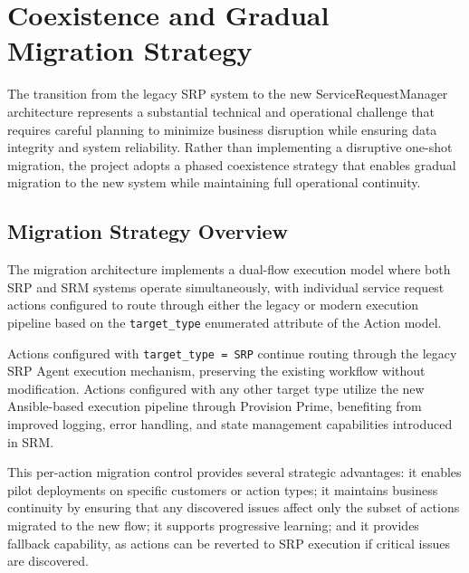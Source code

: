\chapter{Coexistence and Gradual Migration Strategy}

The transition from the legacy SRP system to the new ServiceRequestManager architecture represents a substantial technical and operational challenge that requires careful planning to minimize business disruption while ensuring data integrity and system reliability. Rather than implementing a disruptive one-shot migration, the project adopts a phased coexistence strategy that enables gradual migration to the new system while maintaining full operational continuity.

\section{Migration Strategy Overview}

The migration architecture implements a dual-flow execution model where both SRP and SRM systems operate simultaneously, with individual service request actions configured to route through either the legacy or modern execution pipeline based on the \texttt{target\_type} enumerated attribute of the Action model.


Actions configured with \texttt{target\_type = SRP} continue routing through the legacy SRP Agent execution mechanism, preserving the existing workflow without modification. Actions configured with any other target type utilize the new Ansible-based execution pipeline through Provision Prime, benefiting from improved logging, error handling, and state management capabilities introduced in SRM.

This per-action migration control provides several strategic advantages: it enables pilot deployments on specific customers or action types; it maintains business continuity by ensuring that any discovered issues affect only the subset of actions migrated to the new flow; it supports progressive learning; and it provides fallback capability, as actions can be reverted to SRP execution if critical issues are discovered.

